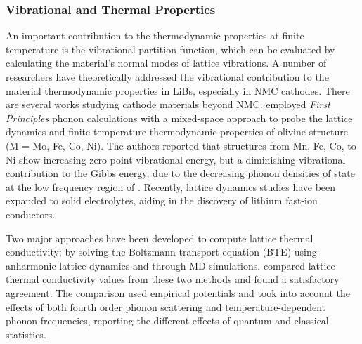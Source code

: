 \documentclass[../main.tex]{subfiles}
\begin{document}
\subsubsection{Vibrational and Thermal Properties}
An important contribution to the thermodynamic properties at finite temperature is the vibrational partition function, which can be evaluated by calculating the material’s normal modes of lattice vibrations. A number of researchers have theoretically addressed the vibrational contribution to the material thermodynamic properties in LiBs, especially in NMC cathodes.\cite{du2016insight,yang2019highly,yang2020chemical} There are several works studying cathode materials beyond NMC. \citeauthor{shang2012lattice} employed \textit{First Principles} phonon calculations with a mixed-space approach to probe the lattice dynamics and finite-temperature thermodynamic properties of olivine structure  (M = Mo, Fe, Co, Ni).\cite{shang2012lattice} The authors reported that  structures from Mn, Fe, Co, to Ni show increasing zero-point vibrational energy, but a diminishing vibrational contribution to the Gibbs energy, due to the decreasing phonon densities of state at the low frequency region of . Recently, lattice dynamics studies have been expanded to solid electrolytes, aiding in the discovery of lithium fast-ion conductors.\cite{sagotra2019influence} 

Two major approaches have been developed to compute lattice thermal conductivity; by solving the Boltzmann transport equation (BTE) using anharmonic lattice dynamics and through MD simulations. \citeauthor{puligheddu2019computational} compared lattice thermal conductivity values from these two methods and found a satisfactory agreement.\cite{puligheddu2019computational} The comparison used empirical potentials and took into account the effects of both fourth order phonon scattering and temperature-dependent phonon frequencies, reporting the different effects of quantum and classical statistics.
\end{document}
